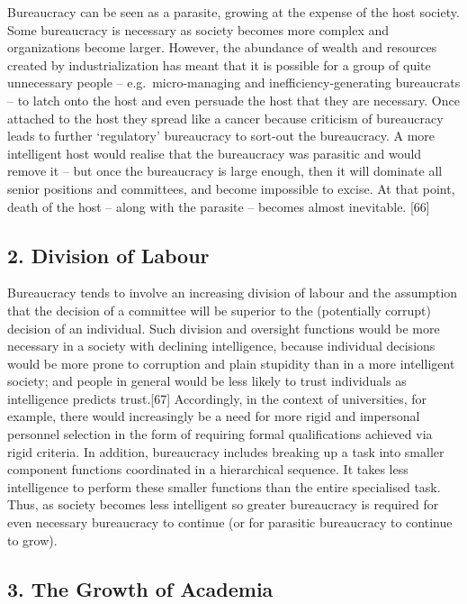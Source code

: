 \documentclass[
]{book}
\begin{document}
Bureaucracy can be seen as a parasite, growing at the expense of the host society. Some bureaucracy is necessary as society becomes more complex and organizations become larger. However, the abundance of wealth and resources created by industrialization has meant that it is possible for a group of quite unnecessary people -- e.g.~micro-managing and inefficiency-generating bureaucrats -- to latch onto the host and even persuade the host that they are necessary. Once attached to the host they spread like a cancer because criticism of bureaucracy leads to further `regulatory' bureaucracy to sort-out the bureaucracy. A more intelligent host would realise that the bureaucracy was parasitic and would remove it -- but once the bureaucracy is large enough, then it will dominate all senior positions and committees, and become impossible to excise. At that point, death of the host -- along with the parasite -- becomes almost inevitable. {[}66{]}

\hypertarget{division-of-labour}{%
\subsection*{2. Division of Labour}\label{division-of-labour}}

Bureaucracy tends to involve an increasing division of labour and the assumption that the decision of a committee will be superior to the (potentially corrupt) decision of an individual. Such division and oversight functions would be more necessary in a society with declining intelligence, because individual decisions would be more prone to corruption and plain stupidity than in a more intelligent society; and people in general would be less likely to trust individuals as intelligence predicts trust.{[}67{]} Accordingly, in the context of universities, for example, there would increasingly be a need for more rigid and impersonal personnel selection in the form of requiring formal qualifications achieved via rigid criteria. In addition, bureaucracy includes breaking up a task into smaller component functions coordinated in a hierarchical sequence. It takes less intelligence to perform these smaller functions than the entire specialised task. Thus, as society becomes less intelligent so greater bureaucracy is required for even necessary bureaucracy to continue (or for parasitic bureaucracy to continue to grow).

\hypertarget{the-growth-of-academia}{%
\subsection*{3. The Growth of Academia}\label{the-growth-of-academia}}
\end{document}

